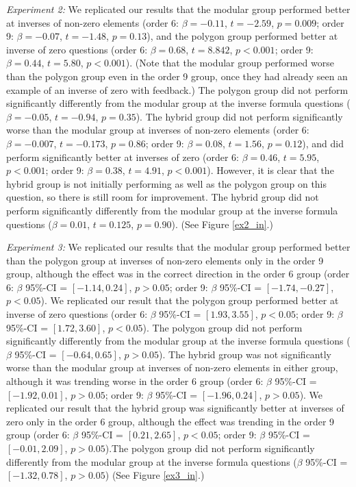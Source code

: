 \documentclass[man,10pt]{apa6}
\begin{document}
\textit{Experiment 2:}  We replicated our results that the modular group performed better at inverses of non-zero elements (order 6: $\beta = -0.11$, $t = -2.59$, $p = 0.009$; order 9: $\beta = -0.07$, $t = -1.48$, $p = 0.13$), and the polygon group performed better at inverse of zero questions (order 6: $\beta = 0.68$, $t = 8.842$, $p < 0.001$; order 9: $\beta = 0.44$, $t = 5.80$, $p < 0.001$). (Note that the modular group performed worse than the polygon group even in the order 9 group, once they had already seen an example of an inverse of zero with feedback.) The polygon group did not perform significantly differently from the modular group at the inverse formula questions ($\beta = -0.05$, $t=-0.94$, $p = 0.35$). The hybrid group did not perform significantly worse than the modular group at inverses of non-zero elements (order 6: $\beta = -0.007$, $t = -0.173$, $p = 0.86$; order 9: $\beta = 0.08$, $t = 1.56$, $p = 0.12$), and did perform significantly better at inverses of zero (order 6: $\beta = 0.46$, $t = 5.95$, $p < 0.001$; order 9: $\beta = 0.38$, $t = 4.91$, $p < 0.001$). However, it is clear that the hybrid group is not initially performing as well as the polygon group on this question, so there is still room for improvement. The hybrid group did not perform significantly differently from the modular group at the inverse formula questions ($\beta = 0.01$, $t=0.125$, $p =0.90$). (See Figure \ref{ex2_in}.) \par 
\textit{Experiment 3:} We replicated our results that the modular group performed better than the polygon group at inverses of non-zero elements only in the order 9 group, although the effect was in the correct direction in the order 6 group (order 6: $\beta$ 95\%-CI = $[-1.14,0.24]$, $p > 0.05$; order 9: $\beta$ 95\%-CI = $[-1.74,-0.27]$, $p < 0.05$). We replicated our result that the polygon group performed better at inverse of zero questions (order 6: $\beta$ 95\%-CI = $[1.93,3.55]$, $p < 0.05$; order 9: $\beta$ 95\%-CI = $[1.72,3.60]$, $p < 0.05$). The polygon group did not perform significantly differently from the modular group at the inverse formula questions ($\beta$ 95\%-CI = $[-0.64,0.65]$, $p > 0.05$). The hybrid group was not significantly worse than the modular group at inverses of non-zero elements in either group, although it was trending worse in the order 6 group (order 6: $\beta$ 95\%-CI = $[-1.92,0.01]$, $p > 0.05$; order 9: $\beta$ 95\%-CI = $[-1.96,0.24]$, $p > 0.05$). We replicated our result that the hybrid group was significantly better at inverses of zero only in the order 6 group, although the effect was trending in the order 9 group (order 6: $\beta$ 95\%-CI = $[0.21,2.65]$, $p < 0.05$; order 9: $\beta$ 95\%-CI = $[-0.01,2.09]$, $p > 0.05$).The polygon group did not perform significantly differently from the modular group at the inverse formula questions ($\beta$ 95\%-CI = $[-1.32,0.78]$, $p > 0.05$) (See Figure \ref{ex3_in}.) \par
\end{document}
